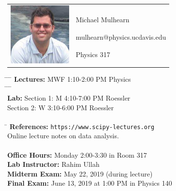 \documentclass[12pt]{article}
\begin{document}
\begin{tabular}{ l l }
  \multirow{6}{*}{\includegraphics[height=1.25in]{mike.jpg}} & \\
  & \\
  & \large Michael Mulhearn \\
  & \large mulhearn@physics.ucdavis.edu \\
  & \large Physics 317 \\
  & \\
\end{tabular}
\vskip 0.5cm
\noindent
\begin{tabbing}
\hspace*{9em}\= \hspace*{10em} \= \hspace*{6em} \= \kill %
\textbf {Lectures:} \> MWF  1:10-2:00 PM  Physics \\
\hspace*{9em}\= \hspace*{5em} \= \hspace*{8em} \= \kill %
\\
\textbf {Lab:}    \> Section 1: \>  M 4:10-7:00 PM  Roessler \\
                        \> Section 2: \> W 3:10-6:00 PM  Roessler \\
\\
\hspace*{9em}\= \kill %
\textbf {References:}  \>  {\tt https://www.scipy-lectures.org} \\
\> Online lecture notes on data analysis. \\
\\
\textbf{Office Hours:} \> Monday 2:00-3:30 in Room 317 \\
\textbf{Lab Instructor:} \> Rahim Ullah \\
\textbf{Midterm Exam:} \> May 22, 2019 (during lecture)  \\ 
\textbf{Final Exam:} \> June 13, 2019 at 1:00 PM in Physics 140 \\
\end{tabbing}
\end{document}
